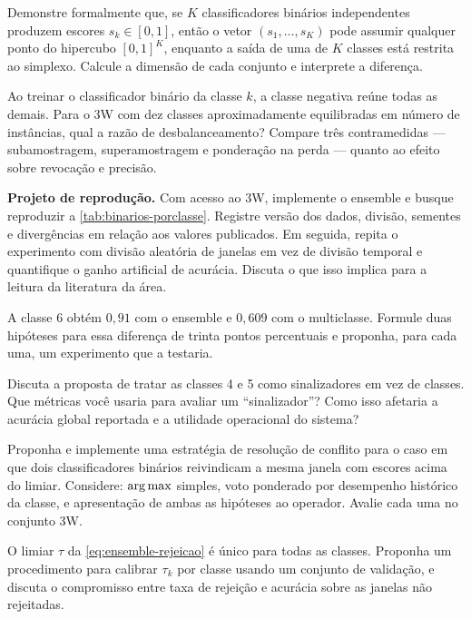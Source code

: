 \begin{exercicios}
\item Demonstre formalmente que, se $K$ classificadores binários independentes produzem
      escores $s_k \in [0,1]$, então o vetor $(s_1, \dots, s_K)$ pode assumir qualquer
      ponto do hipercubo $[0,1]^K$, enquanto a saída de uma  de $K$ classes
      está restrita ao simplexo. Calcule a dimensão de cada conjunto e interprete a
      diferença.

\item Ao treinar o classificador binário da classe $k$, a classe negativa reúne todas as
      demais. Para o 3W com dez classes aproximadamente equilibradas em número de
      instâncias, qual a razão de desbalanceamento? Compare três contramedidas ---
      subamostragem, superamostragem e ponderação na perda --- quanto ao efeito sobre
      revocação e precisão.

\item \textbf{Projeto de reprodução.} Com acesso ao 3W, implemente o ensemble e busque
      reproduzir a \cref{tab:binarios-porclasse}. Registre versão dos dados, divisão,
      sementes e divergências em relação aos valores publicados. Em seguida, repita o
      experimento com divisão aleatória de janelas em vez de divisão temporal e
      quantifique o ganho artificial de acurácia. Discuta o que isso implica para a
      leitura da literatura da área.

\item A classe 6 obtém $0{,}91$ com o ensemble e $0{,}609$ com o multiclasse. Formule
      duas hipóteses para essa diferença de trinta pontos percentuais e proponha, para
      cada uma, um experimento que a testaria.

\item Discuta a proposta de tratar as classes 4 e 5 como sinalizadores em vez de
      classes. Que métricas você usaria para avaliar um ``sinalizador''? Como isso
      afetaria a acurácia global reportada e a utilidade operacional do sistema?

\item Proponha e implemente uma estratégia de resolução de conflito para o caso em que
      dois classificadores binários reivindicam a mesma janela com escores acima do
      limiar. Considere: $\operatorname*{arg\,max}$ simples, voto ponderado por desempenho histórico da
      classe, e apresentação de ambas as hipóteses ao operador. Avalie cada uma no
      conjunto 3W.

\item O limiar $\tau$ da \cref{eq:ensemble-rejeicao} é único para todas as classes.
      Proponha um procedimento para calibrar $\tau_k$ por classe usando um conjunto de
      validação, e discuta o compromisso entre taxa de rejeição e acurácia sobre as
      janelas não rejeitadas.
\end{exercicios}

